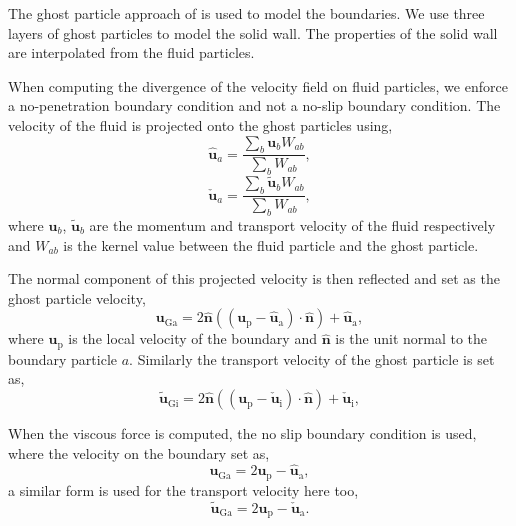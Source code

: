 \documentclass[preprint,12pt]{elsarticle}
\newcommand{\ten}[1]{\ensuremath{\mathbf{#1}}}
\begin{document}
The ghost particle approach of \citet{Adami2012} is used to model the
boundaries. We use three layers of ghost particles to model the solid wall.
The properties of the solid wall are interpolated from the fluid particles.

When computing the divergence of the velocity field on fluid particles, we
enforce a no-penetration boundary condition and not a no-slip boundary
condition. The velocity of the fluid is projected onto the ghost particles
using,
\begin{equation}
  \label{eq:v-ghost}
  \ten{\hat{u}}_a = \frac{\sum_b\ten{u}_b W_{ab}}{\sum_b W_{ab}},
\end{equation}
\begin{equation}
  \label{eq:v-hat-ghost}
  \ten{\check{u}}_a = \frac{\sum_b\tilde{\ten{u}}_b W_{ab}}{\sum_b W_{ab}},
\end{equation}
where $\ten{u}_b$, $\ten{\tilde{u}}_b$ are the momentum and transport velocity
of the fluid respectively and $W_{ab}$ is the kernel value between the fluid
particle and the ghost particle.

The normal component of this projected velocity is then reflected and set as
the ghost particle velocity,
\begin{equation}
  \label{eq:free-slip-bc-u}
  \ten{u}_{\text{Ga}} = 2 \ten{\hat{n}}((\ten{u}_{\text{p}} - \ten{\hat{u}}_{\text{a}})\cdot \ten{\hat{n}}) + \ten{\hat{u}}_{\text{a}},
\end{equation}
where $\ten{u}_{\text{p}}$ is the local velocity of the boundary and
$\ten{\hat{n}}$ is the unit normal to the boundary particle $a$. Similarly the
transport velocity of the ghost particle is set as,
\begin{equation}
  \label{eq:free-slip-bc-u}
  \tilde{\ten{u}}_{\text{Gi}} = 2 \ten{\hat{n}}((\ten{u}_{\text{p}} - \ten{\check{u}}_{\text{i}})\cdot \ten{\hat{n}}) + \ten{\check{u}}_{\text{i}},
\end{equation}

When the viscous force is computed, the no slip boundary condition is used,
where the velocity on the boundary set as,
\begin{equation}
  \label{eq:no-slip-bc-u}
  \ten{u}_{\text{Ga}} = 2 \ten{u}_{\text{p}} - \ten{\hat{u}}_{\text{a}},
\end{equation}
a similar form is used for the transport velocity here too,
\begin{equation}
  \label{eq:no-slip-bc-uhat}
  \tilde{\ten{u}}_{\text{Ga}} = 2 \ten{u}_{\text{p}} - \ten{\check{u}}_{\text{a}}.
\end{equation}
\end{document}
